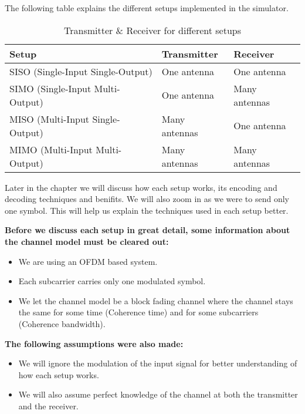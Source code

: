 The following table explains the different setups implemented in the simulator.
\begin{table}[!ht]
    \centering
    \caption{Transmitter \& Receiver for different setups}
    \label{tbl:mytable}
    \begin{tabular}{lll}
        \toprule
        Setup & Transmitter & Receiver \\
        \midrule
        SISO (Single-Input Single-Output)  & One antenna   & One antenna   \\
        SIMO (Single-Input Multi-Output)   & One antenna   & Many antennas \\
        MISO (Multi-Input Single-Output)   & Many antennas & One antenna   \\
        MIMO (Multi-Input Multi-Output)    & Many antennas & Many antennas \\
        \bottomrule
    \end{tabular}
\end{table}

Later in the chapter we will discuss how each setup works, its encoding and decoding techniques and benifits. We will also zoom in as we were to send only one symbol. This will help us explain the techniques used in each setup better.

\begin{GrayBox}
    \textbf{Before we discuss each setup in great detail, some information about the channel model must be cleared out:}
    \begin{itemize}
        \item We are using an OFDM based system.
        \item Each subcarrier carries only one modulated symbol.
        \item We let the channel model be a block fading channel where the channel stays the same for some time (Coherence time) and for some subcarriers (Coherence bandwidth).
    \end{itemize}

    \textbf{The following assumptions were also made:}
    \begin{itemize}
        \item We will ignore the modulation of the input signal for better understanding of how each setup works.
        \item We will also assume perfect knowledge of the channel at both the transmitter and the receiver.
    \end{itemize}
\end{GrayBox}

